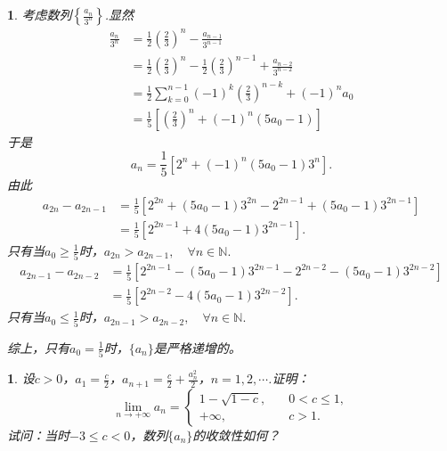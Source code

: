 \documentclass[utf8]{book}
\newtheorem{example}{}[section]             %
\newtheorem{solution}{}
\begin{document}
\begin{solution}
考虑数列$\left\{\displaystyle\frac{a_{n}}{3^{n}}\right\}$.显然
\begin{equation*}
\begin{split}
\frac{a_n}{3^n} &=\frac{1}{2}\left(\frac{2}{3}\right)^n - \frac{a_{n-1}}{3^{n-1}} \\&= \frac{1}{2}\left(\frac{2}{3}\right)^n - \frac{1}{2}\left(\frac{2}{3}\right)^{n-1}  + \frac{a_{n-2}}{3^{n-2}}\\
&=\frac{1}{2}\sum_{k=0}^{n-1}(-1)^k\left(\frac{2}{3}\right)^{n-k}+(-1)^na_0\\
&=\frac{1}{5}\left[\left(\frac{2}{3}\right)^n+(-1)^n(5a_0-1)\right]
\end{split}
\end{equation*}
于是
$$a_n=\frac{1}{5}\left[2^n+(-1)^n(5a_0-1)3^n\right].$$
由此
\begin{equation*}
\begin{split}
a_{2n}-a_{2n-1}&=\frac{1}{5}[2^{2n}+(5a_0-1)3^{2n} - 2^{2n-1}+(5a_0-1)3^{2n-1}]\\&=\frac{1}{5}[2^{2n-1}+4(5a_0-1)3^{2n-1}].
\end{split}
\end{equation*}
只有当$a_0\geq\frac{1}{5}$时，$a_{2n}>a_{2n-1},\quad\forall n\in\mathbb{N}.$
\begin{equation*}
\begin{split}
a_{2n-1}-a_{2n-2}&=\frac{1}{5}[2^{2n-1}-(5a_0-1)3^{2n-1} - 2^{2n-2}-(5a_0-1)3^{2n-2}]\\&=\frac{1}{5}[2^{2n-2}-4(5a_0-1)3^{2n-2}].
\end{split}
\end{equation*}
只有当$a_0\leq\frac{1}{5}$时，$a_{2n-1}>a_{2n-2},\quad\forall n\in\mathbb{N}.$

综上，只有$a_0=\frac{1}{5}$时，$\{a_n\}$是严格递增的。
\end{solution}
\begin{example}
设$c>0$，$a_1=\frac{c}{2}$，$a_{n+1} = \frac{c}{2}+\frac{a_n^2}{2}$，$n=1,2,\cdots$.证明：
\begin{equation*}
\displaystyle\lim_{n\to +\infty}a_n=
\begin{cases}
1-\sqrt{1-c}, \quad &0<c\leq 1,\\
+\infty,\quad &c >1.
\end{cases}
\end{equation*}
试问：当时$-3\leq c < 0$，数列$\{a_n\}$的收敛性如何？
\end{example}
\end{document}
